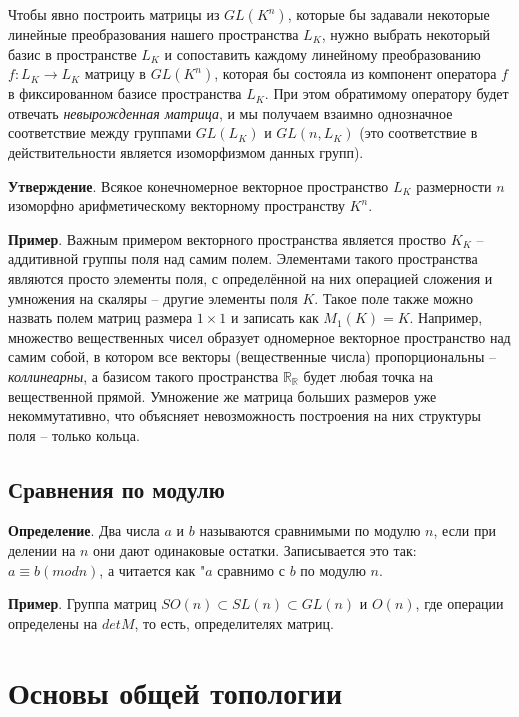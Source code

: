\documentclass[a4paper]{book}
\begin{document}
Чтобы явно построить матрицы из $GL(K^n)$, которые бы задавали некоторые линейные преобразования нашего пространства $L_K$, нужно выбрать некоторый базис в пространстве $L_K$ и сопоставить каждому линейному преобразованию $f: L_K \rightarrow L_K$ матрицу в $GL(K^n)$, которая бы состояла из компонент оператора $f$ в фиксированном базисе пространства $L_K$.  При этом обратимому оператору будет отвечать \textit{невырожденная матрица}, и мы получаем взаимно однозначное соответствие между группами $GL(L_K)$ и $GL(n, L_K)$ (это соответствие в действительности является изоморфизмом данных групп).

\textbf{Утверждение}. Всякое конечномерное векторное пространство $L_K$ размерности $n$ изоморфно арифметическому векторному пространству $K^n$. 





\textbf{Пример}. Важным примером векторного пространства является проство $K_K$ -- аддитивной группы поля над самим полем. Элементами такого пространства являются просто элементы поля, с определённой на них операцией сложения и умножения на скаляры -- другие элементы поля $K$. Такое поле также можно назвать полем матриц размера $1\times 1$ и записать как $M_1 (K) = K$. Например, множество вещественных чисел образует одномерное векторное пространство над самим собой, в котором все векторы (вещественные числа) пропорциональны -- \textit{коллинеарны}, а базисом такого пространства $\mathbb{R_{\mathbb{R}}}$ будет любая точка на вещественной прямой. Умножение же матрица больших размеров уже некоммутативно, что объясняет невозможность построения на них структуры поля -- только кольца. 


\section{Сравнения по модулю}

\textbf{Определение}. Два числа $a$ и $b$ называются сравнимыми по модулю $n$, если при делении на $n$ они дают одинаковые остатки. Записывается это так: $a \equiv b (mod n)$, а читается как "$a$ сравнимо с $b$ по модулю $n$. 

\textbf{Пример}. Группа матриц $SO(n)\subset SL(n)\subset GL(n)$ и $O(n)$, где операции определены на $detM$, то есть, определителях матриц. 


\chapter{Основы общей топологии}
\end{document}
